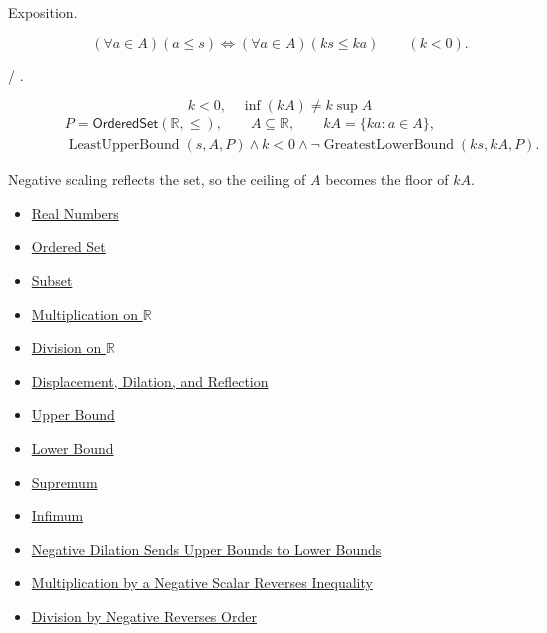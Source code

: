\begin{remark*}
\begin{description}
  \item[Exposition.]
\[
(\forall a\in A)(a\leq s)
\Longleftrightarrow
(\forall a\in A)(ks\leq ka)
\qquad(k<0).
\]


  \item[ / .]
  \[
k<0,\quad \inf(kA)\neq k\sup A
\]
\[
\begin{aligned}
&P=\mathsf{OrderedSet}(\mathbb{R},\leq),\qquad A\subseteq\mathbb{R},\qquad kA=\{ka:a\in A\},\\
&\operatorname{LeastUpperBound}(s,A,P)\land k<0\land
\neg\operatorname{GreatestLowerBound}(ks,kA,P).
\end{aligned}
\]
\end{description}
\end{remark*}

\begin{remark*}[Interpretation]
Negative scaling reflects the set, so the ceiling of $A$ becomes the floor of
$kA$.
\end{remark*}

\begin{dependencies}
\begin{itemize}
  \item \hyperref[def:reals]{Real Numbers}
  \item \hyperref[def:ordered-set]{Ordered Set}
  \item \hyperref[def:subset]{Subset}
  \item \hyperref[def:multiplication-on-r]{Multiplication on $\mathbb{R}$}
  \item \hyperref[def:division-on-r]{Division on $\mathbb{R}$}
  \item \hyperref[def:displacement-dilation-reflection]{Displacement, Dilation, and Reflection}
  \item \hyperref[def:real-upper-bound]{Upper Bound}
  \item \hyperref[def:real-lower-bound]{Lower Bound}
  \item \hyperref[def:supremum]{Supremum}
  \item \hyperref[def:infimum]{Infimum}
  \item \hyperref[prop:negative-dilation-sends-upper-to-lower-bounds]{Negative Dilation Sends Upper Bounds to Lower Bounds}
  \item \hyperref[thm:ineq-multiply-negative]{Multiplication by a Negative Scalar Reverses Inequality}
  \item \hyperref[lem:division-by-negative-reverses-order]{Division by Negative Reverses Order}
\end{itemize}
\end{dependencies}


